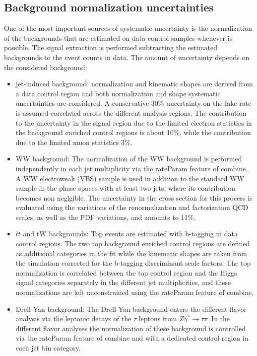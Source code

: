 \subsection*{Background normalization uncertainties}
One of the most important sources of systematic uncertainty is the normalization of the backgrounds that are estimated on data control samples whenever is possible. The signal extraction is performed subtracting the estimated backgrounds to the event counts in data. The amount of uncertainty depends on the considered background:
\begin{itemize}
\item  jet-induced background: normalization and kinematic shapes are derived from a
data control region and both normalization and shape systematic uncertainties are
considered. A conservative 30$\%$ uncertainty on the fake rate is assumed correlated across the different analysis regions. The contribution to the uncertainty in the signal region due to the limited electron statistics in the background enriched control regions is about 10\%, while the contribution due
to the limited muon statistics 3\%. 
\item WW background: The normalization of the WW background is performed independently in each jet multiplicity via the rateParam feature of combine. 
A WW electroweak (VBS) sample is used in addition to the standard WW sample in
the phase spaces with at least two jets, where its contribution becomes non neglgible.
The uncertainty in the cross section for this process is evaluated using the variations
of the renormalization and factorization QCD scales, as well as the PDF variations,
and amounts to 11\%.
\item $\bar{t}t$ and tW backgrounds: Top events are estimated with b-tagging in data control regions. The two top background enriched control regions are defined as additional categories in the fit while the kinematic shapes are taken from the simulation corrected for the b-tagging discriminant scale factors. The top normalization is correlated between the top control region and the Higgs signal categories separately in
the different jet multiplicities, and these normalizations are left unconstrained using the rateParam feature of combine. 
\item Drell-Yan background: The Drell-Yan background enters the different flavor analysis via the leptonic decays of the $\tau$ leptons from $Z \gamma^* \to \tau \tau$. In the different flavor
analyses the normalization of these background is controlled via the rateParam
feature of combine and with a dedicated control region in each jet bin category. 


\end{itemize}
